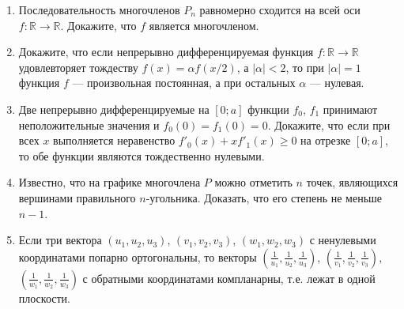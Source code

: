 \begin{enumerate}

\item Последовательность многочленов $P_n$ равномерно сходится на всей оси $f: \mathbb{R} \to \mathbb{R}$. Докажите, что $f$ является многочленом.

\item Докажите, что если непрерывно дифференцируемая функция $f: \mathbb{R} \to \mathbb{R}$ удовлевторяет тождеству $f(x) = \alpha f(x / 2)$, а $|\alpha| < 2$, то при $|\alpha| = 1$ функция $f$ --- произвольная постоянная, а при остальных $\alpha$ --- нулевая.

\item Две непрерывно дифференцируемые на $[0; a]$ функции $f_0$, $f_1$ принимают неположительные значения и $f_0(0) = f_1(0) = 0$. Докажите, что если при всех $x$ выполняется неравенство $f'_0(x) + x f'_1(x) \geqslant 0$ на отрезке $[0; a]$, то обе функции являются тождественно нулевыми.

\item Известно, что на графике многочлена $P$ можно отметить $n$ точек, являющихся вершинами правильного $n$-угольника. Доказать, что его степень не меньше $n - 1$.

\item Если три вектора $(u_1, u_2, u_3)$, $(v_1, v_2, v_3)$, $(w_1, w_2, w_3)$ с ненулевыми координатами попарно ортогональны, то векторы $\left(\frac{1}{u_1}, \frac{1}{u_2}, \frac{1}{u_3} \right)$, $\left(\frac{1}{v_1}, \frac{1}{v_2}, \frac{1}{v_3} \right)$, $\left(\frac{1}{w_1}, \frac{1}{w_2}, \frac{1}{w_3} \right)$ с обратными координатами компланарны, т.е. лежат в одной плоскости.
\end{enumerate}
